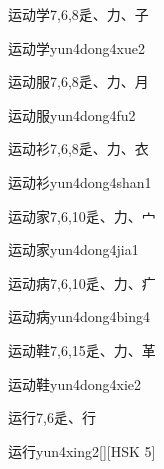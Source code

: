 \begin{Entry}{运动学}{7,6,8}{⾡、⼒、⼦}
  \begin{Phonetics}{运动学}{yun4dong4xue2}
  \end{Phonetics}
\end{Entry}

\begin{Entry}{运动服}{7,6,8}{⾡、⼒、⽉}
  \begin{Phonetics}{运动服}{yun4dong4fu2}
  \end{Phonetics}
\end{Entry}

\begin{Entry}{运动衫}{7,6,8}{⾡、⼒、⾐}
  \begin{Phonetics}{运动衫}{yun4dong4shan1}
  \end{Phonetics}
\end{Entry}

\begin{Entry}{运动家}{7,6,10}{⾡、⼒、⼧}
  \begin{Phonetics}{运动家}{yun4dong4jia1}
  \end{Phonetics}
\end{Entry}

\begin{Entry}{运动病}{7,6,10}{⾡、⼒、⽧}
  \begin{Phonetics}{运动病}{yun4dong4bing4}
  \end{Phonetics}
\end{Entry}

\begin{Entry}{运动鞋}{7,6,15}{⾡、⼒、⾰}
  \begin{Phonetics}{运动鞋}{yun4dong4xie2}
  \end{Phonetics}
\end{Entry}

\begin{Entry}{运行}{7,6}{⾡、⾏}
  \begin{Phonetics}{运行}{yun4xing2}[][HSK 5]
  \end{Phonetics}
\end{Entry}

